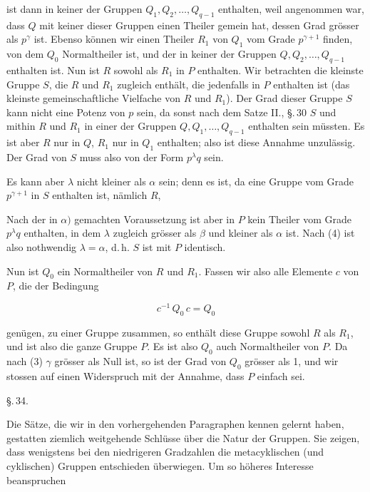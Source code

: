 ist dann in keiner der Gruppen $Q_1, Q_2, \dots, Q_{q-1}$ enthalten, weil angenommen war, dass $Q$ mit keiner dieser Gruppen einen Theiler gemein hat, dessen Grad grösser als $p^{\gamma}$ ist. Ebenso können wir einen Theiler $R_1$ von $Q_1$ vom Grade $p^{\gamma+1}$ finden, von dem $Q_0$ Normaltheiler ist, und der in keiner der Gruppen $Q, Q_2, \dots, Q_{q-1}$ enthalten ist. Nun ist $R$ sowohl als $R_1$ in $P$ enthalten. Wir betrachten die kleinste Gruppe $S$, die $R$ und $R_1$ zugleich enthält, die jedenfalls in $P$ enthalten ist (das kleinste gemeinschaftliche Vielfache von $R$ und $R_1$). Der Grad dieser Gruppe $S$ kann nicht eine Potenz von $p$ sein, da sonst nach dem Satze II., \S.\,30 $S$ und mithin $R$ und $R_1$ in einer der Gruppen $Q, Q_1, \dots, Q_{q-1}$ enthalten sein müssten. Es ist aber $R$ nur in $Q$, $R_1$ nur in $Q_1$ enthalten; also ist diese Annahme unzulässig. Der Grad von $S$ muss also von der Form $p^{\lambda} q$ sein.

Es kann aber $\lambda$ nicht kleiner als $\alpha$ sein; denn es ist, da eine Gruppe vom Grade $p^{\gamma+1}$ in $S$ enthalten ist, nämlich $R$,


Nach der in $\alpha)$ gemachten Voraussetzung ist aber in $P$ kein Theiler vom Grade $p^{\lambda} q$ enthalten, in dem $\lambda$ zugleich grösser als $\beta$ und kleiner als $\alpha$ ist. Nach (4) ist also nothwendig $\lambda = \alpha$, d.\,h. $S$ ist mit $P$ identisch.

Nun ist $Q_0$ ein Normaltheiler von $R$ und $R_1$. Fassen wir also alle Elemente $c$ von $P$, die der Bedingung

\[ c^{-1}\,Q_0\,c = Q_0 \]

genügen, zu einer Gruppe zusammen, so enthält diese Gruppe sowohl $R$ als $R_1$, und ist also die ganze Gruppe $P$. Es ist also $Q_0$ auch Normaltheiler von $P$. Da nach (3) $\gamma$ grösser als Null ist, so ist der Grad von $Q_0$ grösser als 1, und wir stossen auf einen Widerspruch mit der Annahme, dass $P$ einfach sei.

\begin{center}
\S.\,34.

\end{center}

Die Sätze, die wir in den vorhergehenden Paragraphen kennen gelernt haben, gestatten ziemlich weitgehende Schlüsse über die Natur der Gruppen. Sie zeigen, dass wenigstens bei den niedrigeren Gradzahlen die metacyklischen (und cyklischen) Gruppen entschieden überwiegen. Um so höheres Interesse beanspruchen

